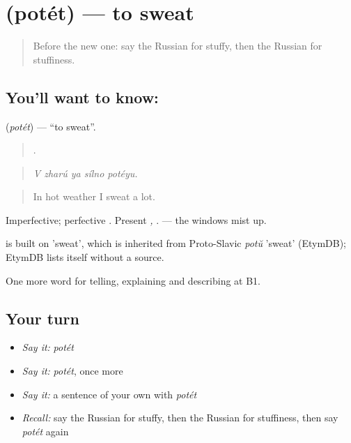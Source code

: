 \section[\texorpdfstring{\ru{потеть} (potét)}{потеть (potét)}]{ (potét) — to sweat}

\label{lesson:RU-C468-potet}



\begin{quote}
Before the new one: say the Russian for stuffy, then the Russian for stuffiness.
\end{quote}

\subsection*{You'll want to know: }
\textbf{} (\emph{potét}) — \textquotedblleft{}to sweat\textquotedblright{}.

\begin{quote}
    .
\end{quote}

\begin{quote}
\emph{V zharú ya sílno potéyu.}
\end{quote}

\begin{quote}
In hot weather I sweat a lot.
\end{quote}

Imperfective; perfective \emph{}. Present \emph{, }. \emph{ } — the windows mist up.

\begin{cousinweb}
\emph{} is built on \emph{} 'sweat', which is inherited from Proto-Slavic \emph{potŭ} 'sweat' (EtymDB); EtymDB lists \emph{} itself without a source.
\end{cousinweb}

\begin{grammarlens}[title={What you've built}]
One more word for telling, explaining and describing at B1.
\end{grammarlens}

\subsection*{Your turn}
\begin{itemize}
\raggedright
  \item \emph{Say it:} \emph{potét}
  \item \emph{Say it:} \emph{potét}, once more
  \item \emph{Say it:} a sentence of your own with \emph{potét}
  \item \emph{Recall:} say the Russian for stuffy, then the Russian for stuffiness, then say \emph{potét} again
\end{itemize}

